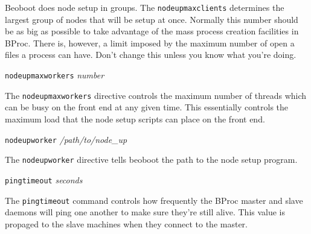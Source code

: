 \begin{description}
Beoboot does node setup in groups.  The \texttt{nodeupmaxclients}
determines the largest group of nodes that will be setup at once.
Normally this number should be as big as possible to take advantage of
the mass process creation facilities in BProc.  There is, however, a
limit imposed by the maximum number of open a files a process can
have.  Don't change this unless you know what you're doing.

\item{\texttt{nodeupmaxworkers}} \emph{number}
\label{conf:nodeupmaxworkers}

The \texttt{nodeupmaxworkers} directive controls the maximum number of
threads which can be busy on the front end at any given time.  This
essentially controls the maximum load that the node setup scripts can
place on the front end.

\item{\texttt{nodeupworker}} \emph{/path/to/node\_up}
\label{conf:nodeupworker}

The \texttt{nodeupworker} directive tells beoboot the path to the node
setup program.

\item{\texttt{pingtimeout} \emph{seconds}}
\label{conf:pingtimeout}

The \texttt{pingtimeout} command controls how frequently the BProc
master and slave daemons will ping one another to make sure they're
still alive.  This value is propaged to the slave machines when they
connect to the master.

\end{description}

%
